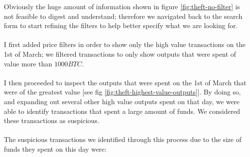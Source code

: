 Obviously the huge amount of information shown in figure \ref{fig:theft-no-filter} is not feasible to digest and understand; therefore we navigated back to the search form to start refining the filters to help better specify what we are looking for. 
\\\\
I first added price filters in order to show only the high value transactions on the 1st of March; we filtered transactions to only show outputs that were spent of value more than $1000BTC$. 
\\\\
I then proceeded to inspect the outputs that were spent on the 1st of March that were of the greatest value [see fig \ref{fig:theft-highest-value-outputs}]. By doing so, and expanding out several other high value outputs spent on that day, we were able to identify transactions that spent a large amount of funds. We considered these transactions as suspicious.
\\\\
The suspicious transactions we identified through this process due to the size of funds they spent on this day were:
